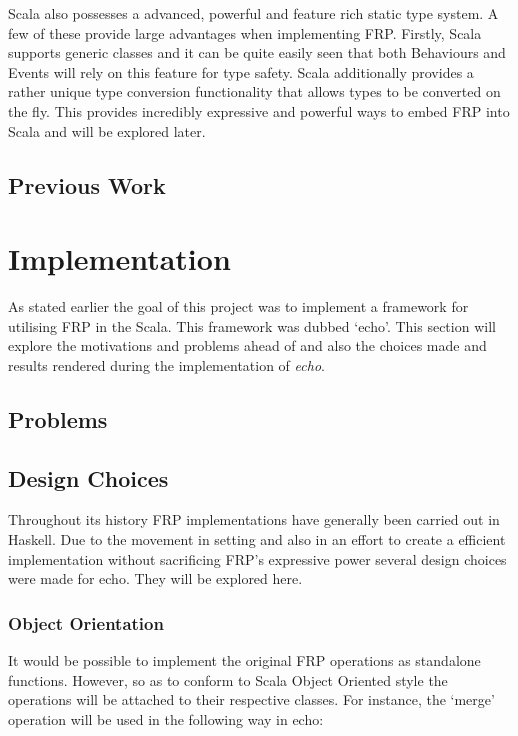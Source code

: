 \documentclass[12pt]{article}
\begin{document}
    Scala also possesses a advanced, powerful and feature rich static type system. A few of these provide large
    advantages when implementing FRP. Firstly, Scala supports generic classes and it can be quite easily seen
    that both Behaviours and Events will rely on this feature for type safety. Scala additionally provides
    a rather unique type conversion functionality that allows types to be converted on the fly. This provides
    incredibly expressive and powerful ways to embed FRP into Scala and will be explored later.
    
    \subsection{Previous Work}
    
  \section{Implementation}
    As stated earlier the goal of this project was to implement a framework for utilising FRP in the Scala. 
    This framework was dubbed `echo'. This section will explore the motivations and problems ahead of
    and also the choices made and results rendered during the implementation of \emph{echo}.
      
    \subsection{Problems}
    
    \subsection{Design Choices}
    Throughout its history FRP implementations have generally been carried out in Haskell. Due to the movement
    in setting and also in an effort to create a efficient implementation without sacrificing FRP's expressive power
    several design choices were made for echo. They will be explored here.
        
      \subsubsection{Object Orientation}
        It would be possible to implement the original FRP operations as standalone functions. However, so
        as to conform to Scala Object Oriented style the operations will be attached to their respective
        classes. For instance, the `merge' operation will be used in the following way in echo:
        
\end{document}

